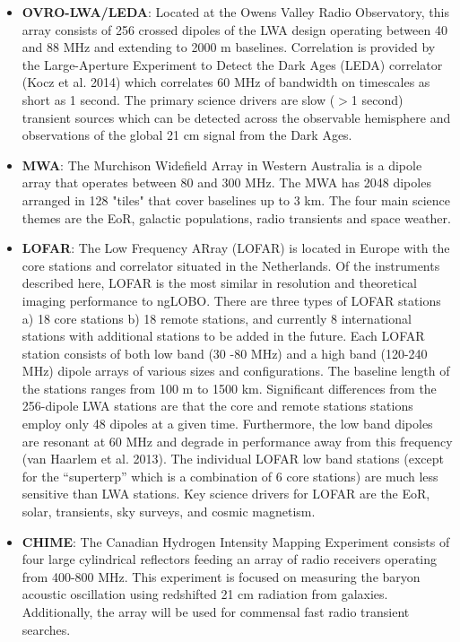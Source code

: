 \documentclass[11pt]{article}
\begin{document}
\begin{itemize}
	\item {\bf OVRO-LWA/LEDA}: Located at the Owens Valley Radio Observatory, this array consists of 256 crossed dipoles of the LWA design operating between 40 and 88 MHz and extending to 2000 m baselines.  Correlation is provided by the Large-Aperture Experiment to Detect the Dark Ages (LEDA) correlator (Kocz et al. 2014) which correlates 60 MHz of bandwidth on timescales as short as 1 second.  The primary science drivers are slow ($>$1 second) transient sources which can be detected across the observable hemisphere and observations of the global 21 cm signal from the Dark Ages.
    \item {\bf MWA}: The Murchison Widefield Array in Western Australia is a dipole array that operates between 80 and 300 MHz. The MWA has 2048 dipoles arranged in 128 "tiles" that cover baselines up to 3 km.  The four main science themes are the EoR, galactic populations, radio transients and space weather.
    \item {\bf LOFAR}: The Low Frequency ARray (LOFAR) is located in Europe with the core stations and correlator situated in the Netherlands. Of the instruments described here, LOFAR is the most similar in resolution and theoretical imaging performance to ngLOBO. There are three types of LOFAR stations a) 18 core stations b) 18 remote stations, and currently 8 international stations with additional stations to be added in the future. Each LOFAR station consists of both low band (30 -80 MHz) and a high band (120-240 MHz) dipole arrays of various sizes and configurations. The baseline length of the stations ranges from 100 m to 1500 km. Significant differences from the 256-dipole LWA stations are that the core and remote stations stations employ only 48 dipoles at a given time. Furthermore,
the low band dipoles are resonant at 60 MHz and degrade in performance away from this frequency (van Haarlem et al. 2013). The individual LOFAR low band stations (except for the ``superterp'' which is a combination of 6 core stations) are much less sensitive than LWA stations. Key science drivers for LOFAR are the EoR, solar, transients, sky surveys, and cosmic magnetism.
    \item {\bf CHIME}: The Canadian Hydrogen Intensity Mapping Experiment consists of four large cylindrical reflectors feeding an array of radio receivers operating from 400-800 MHz.  This experiment is focused on measuring the baryon acoustic oscillation using redshifted 21 cm radiation from galaxies. Additionally, the array will be used for commensal fast radio transient searches. 

\end{itemize}
\end{document}
